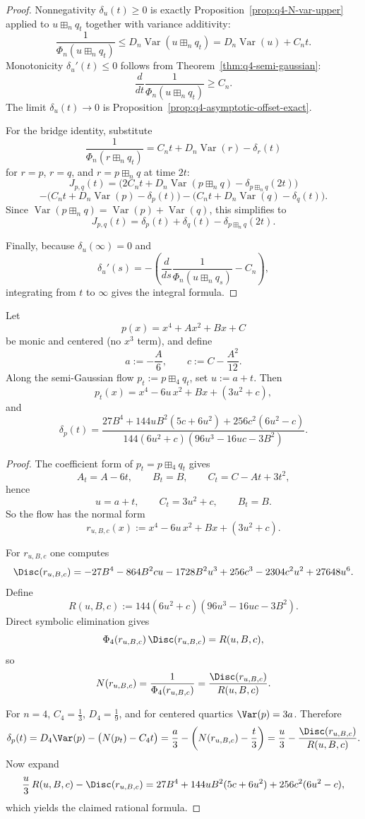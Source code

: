 \begin{proof}
Nonnegativity $\delta_u(t)\ge 0$ is exactly
Proposition~\ref{prop:q4-N-var-upper} applied to $u\boxplus_n q_t$ together
with variance additivity:
\[
\frac1{\Phi_n(u\boxplus_n q_t)}
\le
D_n\operatorname{Var}(u\boxplus_n q_t)
=
D_n\operatorname{Var}(u)+C_n t.
\]
Monotonicity $\delta_u'(t)\le 0$ follows from
Theorem~\ref{thm:q4-semi-gaussian}:
\[
\frac{d}{dt}\frac1{\Phi_n(u\boxplus_n q_t)}\ge C_n.
\]
The limit $\delta_u(t)\to 0$ is
Proposition~\ref{prop:q4-asymptotic-offset-exact}.

For the bridge identity, substitute
\[
\frac1{\Phi_n(r\boxplus_n q_t)}
=
C_n t + D_n\operatorname{Var}(r)-\delta_r(t)
\]
for $r=p$, $r=q$, and $r=p\boxplus_n q$ at time $2t$:
\[
J_{p,q}(t)
=
\bigl(2C_n t+D_n\operatorname{Var}(p\boxplus_n q)-\delta_{p\boxplus_n q}(2t)\bigr)
\]
\[
-\bigl(C_n t+D_n\operatorname{Var}(p)-\delta_p(t)\bigr)
-\bigl(C_n t+D_n\operatorname{Var}(q)-\delta_q(t)\bigr).
\]
Since $\operatorname{Var}(p\boxplus_n q)=\operatorname{Var}(p)+\operatorname{Var}(q)$,
this simplifies to
\[
J_{p,q}(t)=\delta_p(t)+\delta_q(t)-\delta_{p\boxplus_n q}(2t).
\]

Finally, because $\delta_u(\infty)=0$ and
\[
\delta_u'(s)=
-\left(
\frac{d}{ds}\frac1{\Phi_n(u\boxplus_n q_s)}-C_n
\right),
\]
integrating from $t$ to $\infty$ gives the integral formula.
\end{proof}

\begin{proposition}\label{prop:q4-n4-delta-closed}
Let
\[
p(x)=x^4+Ax^2+Bx+C
\]
be monic and centered (no $x^3$ term), and define
\[
a:=-\frac A6,\qquad c:=C-\frac{A^2}{12}.
\]
Along the semi-Gaussian flow $p_t:=p\boxplus_4 q_t$, set $u:=a+t$. Then
\[
p_t(x)=x^4-6u\,x^2+Bx+(3u^2+c),
\]
and
\[
\delta_p(t)=
\frac{27B^4+144uB^2(5c+6u^2)+256c^2(6u^2-c)}
{144(6u^2+c)(96u^3-16uc-3B^2)}.
\]
\end{proposition}

\begin{proof}
The coefficient form of $p_t=p\boxplus_4 q_t$ gives
\[
A_t=A-6t,\qquad B_t=B,\qquad C_t=C-At+3t^2,
\]
hence
\[
u=a+t,\qquad
C_t=3u^2+c,\qquad
B_t=B.
\]
So the flow has the normal form
\[
r_{u,B,c}(x):=x^4-6u\,x^2+Bx+(3u^2+c).
\]

For $r_{u,B,c}$ one computes
\[
\Disc(r_{u,B,c})
=
-27B^4-864B^2cu-1728B^2u^3+256c^3-2304c^2u^2+27648u^6.
\]
Define
\[
R(u,B,c):=144(6u^2+c)(96u^3-16uc-3B^2).
\]
Direct symbolic elimination gives
\[
\Phi_4(r_{u,B,c})\,\Disc(r_{u,B,c})=R(u,B,c),
\]
so
\[
N(r_{u,B,c})
=\frac1{\Phi_4(r_{u,B,c})}
=\frac{\Disc(r_{u,B,c})}{R(u,B,c)}.
\]

For $n=4$, $C_4=\frac13$, $D_4=\frac19$, and for centered quartics
$\Var(p)=3a$. Therefore
\[
\delta_p(t)
=D_4\Var(p)-\bigl(N(p_t)-C_4 t\bigr)
=\frac a3-\left(N(r_{u,B,c})-\frac t3\right)
=\frac u3-\frac{\Disc(r_{u,B,c})}{R(u,B,c)}.
\]
Now expand
\[
\frac u3\,R(u,B,c)-\Disc(r_{u,B,c})
=
27B^4+144uB^2(5c+6u^2)+256c^2(6u^2-c),
\]
which yields the claimed rational formula.
\end{proof}

